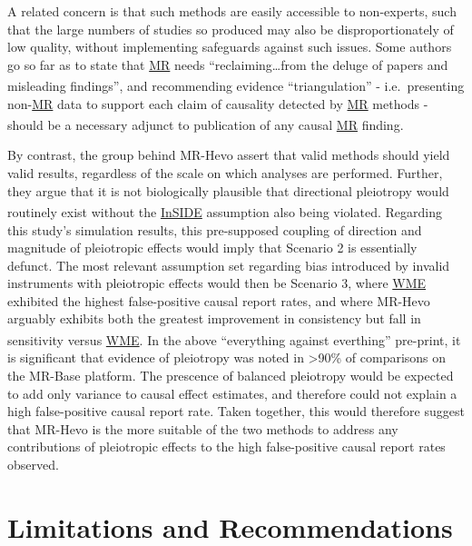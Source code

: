 \documentclass[
]{article}
\begin{document}
A related concern is that such methods are easily accessible to non-experts, such that the large numbers of studies so produced may also be disproportionately of low quality, without implementing safeguards against such issues. Some authors go so far as to state that \hyperref[acronyms_MR]{MR} needs ``reclaiming\ldots from the deluge of papers and misleading findings''\textsuperscript{}, and recommending evidence ``triangulation'' - i.e.~presenting non-\hyperref[acronyms_MR]{MR} data to support each claim of causality detected by \hyperref[acronyms_MR]{MR} methods - should be a necessary adjunct to publication of any causal \hyperref[acronyms_MR]{MR} finding\textsuperscript{}.

By contrast, the group behind MR-Hevo assert that valid methods should yield valid results, regardless of the scale on which analyses are performed. Further, they argue that it is not biologically plausible that directional pleiotropy would routinely exist without the \hyperref[acronyms_InSIDE]{InSIDE} assumption also being violated\textsuperscript{}. Regarding this study's simulation results, this pre-supposed coupling of direction and magnitude of pleiotropic effects would imply that Scenario 2 is essentially defunct. The most relevant assumption set regarding bias introduced by invalid instruments with pleiotropic effects would then be Scenario 3, where \hyperref[acronyms_WME]{WME} exhibited the highest false-positive causal report rates, and where MR-Hevo arguably exhibits both the greatest improvement in consistency but fall in sensitivity versus \hyperref[acronyms_WME]{WME}. In the above ``everything against everthing'' pre-print\textsuperscript{}, it is significant that evidence of pleiotropy was noted in \textgreater90\% of comparisons on the MR-Base platform. The prescence of balanced pleiotropy would be expected to add only variance to causal effect estimates, and therefore could not explain a high false-positive causal report rate. Taken together, this would therefore suggest that MR-Hevo is the more suitable of the two methods to address any contributions of pleiotropic effects to the high false-positive causal report rates observed.

\newpage

\section{Limitations and Recommendations}\label{limitations-and-recommendations}
\end{document}
